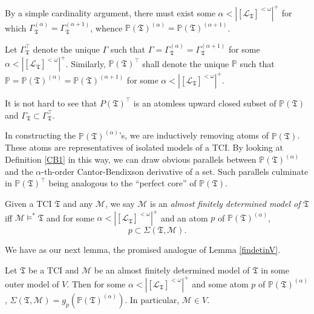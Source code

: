 \documentclass[12pt]{article}
\numberwithin{equation}{section}
\begin{document}
By a simple cardinality argument, there must exist some $\alpha < |[\mathcal{L}_{\mathfrak{T}}]^{< \omega}|^+$ for which $\Gamma_{\mathfrak{T}}^{(\alpha)} = \Gamma_{\mathfrak{T}}^{(\alpha + 1)}$, whence $\mathbb{P}(\mathfrak{T})^{(\alpha)} = \mathbb{P}(\mathfrak{T})^{(\alpha + 1)}$.

\begin{defi}\label{CB2}
Let $\Gamma_{\mathfrak{T}}^{\top}$ denote the unique $\Gamma$ such that $\Gamma = \Gamma_{\mathfrak{T}}^{(\alpha)} = \Gamma_{\mathfrak{T}}^{(\alpha + 1)}$ for some $\alpha < |[\mathcal{L}_{\mathfrak{T}}]^{< \omega}|^+$. Similarly, $\mathbb{P}(\mathfrak{T})^{\top}$ shall denote the unique $\mathbb{P}$ such that $\mathbb{P} = \mathbb{P}(\mathfrak{T})^{(\alpha)} = \mathbb{P}(\mathfrak{T})^{(\alpha + 1)}$ for some $\alpha < |[\mathcal{L}_{\mathfrak{T}}]^{< \omega}|^+$.
\end{defi}

It is not hard to see that $P(\mathfrak{T})^{\top}$ is an atomless upward closed subset of $\mathbb{P}(\mathfrak{T})$ and $\Gamma_{\mathfrak{T}} \subset \Gamma_{\mathfrak{T}}^{\top}$.

\begin{rem}\label{CBrem}
In constructing the $\mathbb{P}(\mathfrak{T})^{(\alpha)}$'s, we are inductively removing atoms of $\mathbb{P}(\mathfrak{T})$. These atoms are representatives of isolated models of a TCI. By looking at Definition \ref{CB1} in this way, we can draw obvious parallels between $\mathbb{P}(\mathfrak{T})^{(\alpha)}$ and the $\alpha$-th-order Cantor-Bendixson derivative of a set. Such parallels culminate in $\mathbb{P}(\mathfrak{T})^{\top}$ being analogous to the ``perfect core'' of $\mathbb{P}(\mathfrak{T})$.
\end{rem}

\begin{defi}
Given a TCI $\mathfrak{T}$ and any $\mathcal{M}$, we say $\mathcal{M}$ is an \emph{almost finitely determined model of} $\mathfrak{T}$ iff $\mathcal{M} \models^* \mathfrak{T}$ and for some $\alpha < |[\mathcal{L}_{\mathfrak{T}}]^{< \omega}|^+$ and an atom $p$ of $\mathbb{P}(\mathfrak{T})^{(\alpha)}$, $$p \subset \Sigma(\mathfrak{T}, \mathcal{M}).$$
\end{defi}

We have as our next lemma, the promised analogue of Lemma \ref{findetinV}.

\begin{lem}\label{afdinV}
Let $\mathfrak{T}$ be a TCI and $\mathcal{M}$ be an almost finitely determined model of $\mathfrak{T}$ in some outer model of $V$. Then for some $\alpha < |[\mathcal{L}_{\mathfrak{T}}]^{< \omega}|^+$ and some atom $p$ of $\mathbb{P}(\mathfrak{T})^{(\alpha)}$, $\Sigma(\mathfrak{T}, \mathcal{M}) = g_p (\mathbb{P}(\mathfrak{T})^{(\alpha)})$. In particular, $\mathcal{M} \in V$.
\end{lem}
\end{document}
